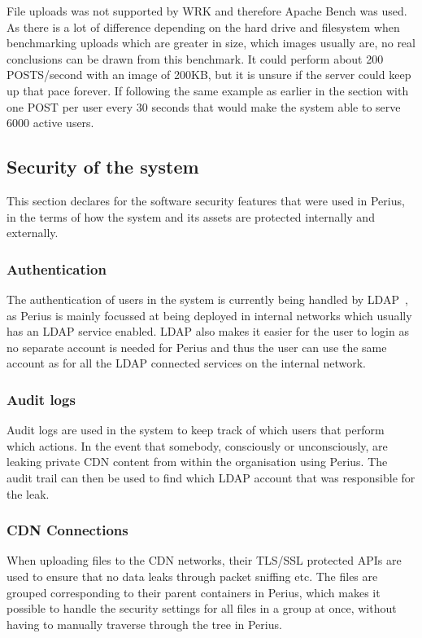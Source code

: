 \documentclass[a4paper,12pt]{article}
\begin{document}
\par
File uploads was not supported by WRK and therefore Apache Bench was used. As there is a lot of
difference depending on the hard drive and filesystem when benchmarking uploads which are greater in
size, which images usually are, no real conclusions can be drawn from this benchmark. It could
perform about 200 POSTS/second with an image of 200KB, but it is unsure if the server could keep up
that pace forever. If following the same example as earlier in the section with one POST per user
every 30 seconds that would make the system able to serve 6000 active users.

\newpage
\subsection{Security of the system}
This section declares for the software security features that were used in Perius, in the terms of
how the system and its assets are protected internally and externally.

\subsubsection{Authentication}
The authentication of users in the system is currently being handled by LDAP~\cite{LDAP}, as Perius 
is mainly focussed at being deployed in internal networks which usually has an LDAP service enabled. 
LDAP also makes it easier for the user to login as no separate account is needed for Perius and 
thus the user can use the same account as for all the LDAP connected services on the internal 
network.

\subsubsection{Audit logs}
Audit logs are used in the system to keep track of which users that perform which actions. In the
event that somebody, consciously or unconsciously, are leaking private CDN content from within the
organisation using Perius. The audit trail can then be used to find which LDAP account that was
responsible for the leak.

\subsubsection{CDN Connections} \label{sec:cdn_connections}
When uploading files to the CDN networks, their TLS/SSL protected APIs are used to ensure that no
data leaks through packet sniffing etc. The files are grouped corresponding to their parent
containers in Perius, which makes it possible to handle the security settings for all files in a
group at once, without having to manually traverse through the tree in Perius.
\end{document}
